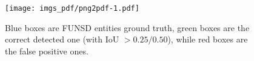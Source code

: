 \documentclass[runningheads]{llncs}
\begin{document}
\begin{table}[t!]
    \centering
    \caption{\textbf{Entity detection results}. YOLOv5 \cite{YOLOv5}-small performances on the entity detection task.}
    \label{tab:iou_f1}
\end{table}

\begin{figure}[t]
    \centering
    \texttt{[image: imgs\_pdf/png2pdf-1.pdf]}
    \caption{Blue boxes are FUNSD entities ground truth, green boxes are the correct detected one (with IoU $> 0.25 / 0.50$), while red boxes are the false positive ones.}
    \label{fig:det}
\end{figure}
\end{document}
